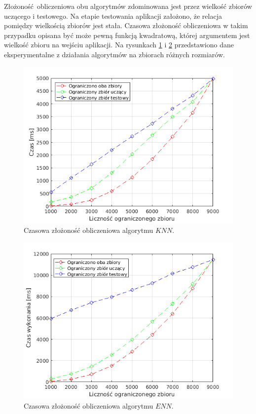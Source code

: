 Złożoność obliczeniowa obu algorytmów zdominowana jest przez wielkość zbiorów uczącego i testowego. Na etapie testowania aplikacji założono, że relacja pomiędzy wielkością zbiorów jest stała. Czasowa złożoność obliczeniowa w takim przypadku opisana być może pewną funkcją kwadratową, której argumentem jest wielkość zbioru na wejściu aplikacji.
Na rysunkach \ref{fig:knn_compexity} i \ref{fig:enn_complexity} przedstawiono dane eksperymentalne z działania algorytmów na zbiorach różnych rozmiarów.

\begin{figure}[H]
	\centering
	\includegraphics[width=14cm]{img/knn_compexity}
	\caption{Czasowa złożoność obliczeniowa algorytmu $KNN$.}
	\label{fig:knn_compexity}
\end{figure}
\begin{figure}[H]
	\centering
	\includegraphics[width=14cm]{img/enn_complexity}
	\caption{Czasowa złożoność obliczeniowa algorytmu $ENN$.}
	\label{fig:enn_complexity}
\end{figure}

